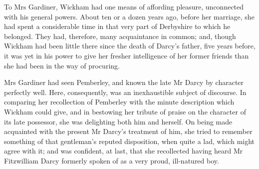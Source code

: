 To Mrs Gardiner, Wickham had one means of affording pleasure, unconnected with his general powers. About ten or a dozen years ago, before her marriage, she had spent a considerable time in that very part of Derbyshire to which he belonged. They had, therefore, many acquaintance in common; and, though Wickham had been little there since the death of Darcy's father, five years before, it was yet in his power to give her fresher intelligence of her former friends than she had been in the way of procuring.

Mrs Gardiner had seen Pemberley, and known the late Mr Darcy by character perfectly well. Here, consequently, was an inexhaustible subject of discourse. In comparing her recollection of Pemberley with the minute description which Wickham could give, and in bestowing her tribute of praise on the character of its late possessor, she was delighting both him and herself. On being made acquainted with the present Mr Darcy's treatment of him, she tried to remember something of that gentleman's reputed disposition, when quite a lad, which might agree with it; and was confident, at last, that she recollected having heard Mr Fitzwilliam Darcy formerly spoken of as a very proud, ill-natured boy.